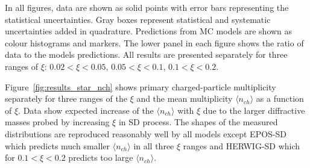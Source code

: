 In all figures, data are shown as solid points with error bars representing the statistical uncertainties. Gray boxes represent statistical and systematic uncertainties added in quadrature. Predictions from MC models are shown as colour histograms and markers. The lower panel in each figure shows the ratio of data to the models predictions. All results are presented separately for three ranges of $\xi$: $0.02 < \xi<0.05$, $0.05<\xi<0.1$, $0.1<\xi<0.2$.

Figure~\ref{fig:results_star_nch} shows primary charged-particle multiplicity  separately for three ranges of the $\xi$ and the mean multiplicity $\langle n_{ch}\rangle$ as a function of $\xi$.  Data show expected increase of the $\langle n_{ch}\rangle$ with $\xi$ due to the larger diffractive masses probed by increasing $\xi$ in SD process. The shapes of the measured distributions are reproduced reasonably well by all models except EPOS-SD which predicts much smaller $\langle n_{ch}\rangle$ in all three $\xi$ ranges and HERWIG-SD which for $0.1<\xi<0.2$ predicts too large $\langle n_{ch}\rangle$.
